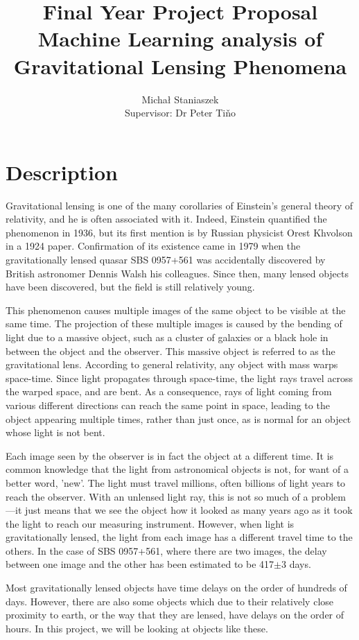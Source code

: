 \documentclass[10pt,a4paper]{article}
\title{\small{Final Year Project Proposal}\\\Large{Machine Learning analysis of Gravitational Lensing Phenomena}}
\author{Micha{\l} Staniaszek \\\small{Supervisor: Dr Peter Ti\v{n}o}}
\begin{document}
\maketitle

\section*{Description}

Gravitational lensing is one of the many corollaries of Einstein's general theory of relativity, and he is often associated with it. Indeed, Einstein quantified the phenomenon in 1936, but its first mention is by Russian physicist Orest Khvolson in a 1924 paper. Confirmation of its existence came in 1979 when the gravitationally lensed quasar SBS 0957+561 was accidentally discovered by British astronomer Dennis Walsh his colleagues. Since then, many lensed objects have been discovered, but the field is still relatively young.
\par This phenomenon causes multiple images of the same object to be visible at the same time. The projection of these multiple images is caused by the bending of light due to a massive object, such as a cluster of galaxies or a black hole in between the object and the observer. This massive object is referred to as the gravitational lens. According to general relativity, any object with mass warps space-time. Since light propagates through space-time, the light rays travel across the warped space, and are bent. As a consequence, rays of light coming from various different directions can reach the same point in space, leading to the object appearing multiple times, rather than just once, as is normal for an object whose light is not bent.
\par Each image seen by the observer is in fact the object at a different time. It is common knowledge that the light from astronomical objects is not, for want of a better word, 'new'. The light must travel millions, often billions of light years to reach the observer. With an unlensed light ray, this is not so much of a problem---it just means that we see the object how it looked as many years ago as it took the light to reach our measuring instrument. However, when light is gravitationally lensed, the light from each image has a different travel time to the others. In the case of SBS 0957+561, where there are two images, the delay between one image and the other has been estimated to be 417$\pm$3 days.
\par Most gravitationally lensed objects have time delays on the order of hundreds of days. However, there are also some objects which due to their relatively close proximity to earth, or the way that they are lensed, have delays on the order of hours. In this project, we will be looking at objects like these. 
\end{document}
